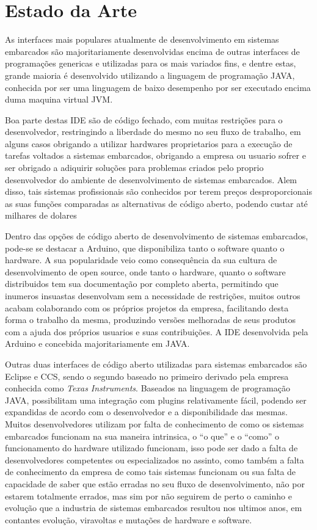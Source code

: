 \chapter{Estado da Arte}
As interfaces mais populares atualmente de desenvolvimento em sistemas embarcados são  majoritariamente desenvolvidas encima de
outras interfaces de programações genericas e utilizadas para os mais variados fins, e dentre estas, grande maioria é desenvolvido
utilizando a linguagem de programação JAVA, conhecida por ser uma linguagem de baixo desempenho por ser executado encima duma maquina
virtual JVM.

Boa parte destas IDE são de código fechado, com muitas restrições para o desenvolvedor, restringindo a liberdade do mesmo no seu fluxo
de trabalho, em alguns casos obrigando a utilizar hardwares proprietarios para a execução de tarefas voltados a sistemas embarcados,
obrigando a empresa ou usuario sofrer e ser obrigado a adiquirir soluções para problemas criados pelo proprio desenvolvedor do
ambiente de desenvolvimento de sistemas embarcados.
Alem disso, tais sistemas profissionais são conhecidos por terem preços desproporcionais as suas funções comparadas as alternativas de
código aberto, podendo custar até milhares de dolares %

Dentro das opções de código aberto de desenvolvimento de sistemas embarcados, pode-se se destacar a Arduino, que disponibiliza tanto o
software quanto o hardware. A sua popularidade veio como consequência da sua cultura de desenvolvimento de open source, onde
tanto o hardware, quanto o software distribuidos tem sua documentação por completo aberta, permitindo que inumeros insuastas desenvolvam
sem a necessidade de restrições, muitos outros acabam colaborando com os próprios projetos da empresa, facilitando desta forma
o trabalho da mesma, produzindo versões melhoradas de seus produtos com a ajuda dos próprios usuarios e suas contribuições. A IDE
desenvolvida pela Arduino e concebida majoritariamente em JAVA.

Outras duas interfaces de código aberto utilizadas para sistemas embarcados são Eclipse e CCS, sendo o segundo baseado no primeiro
derivado pela empresa conhecida como \textit{Texas Instruments}. Baseados na linguagem de programação JAVA, possibilitam uma
integração com plugins relativamente fácil, podendo ser expandidas de acordo com o desenvolvedor e a disponibilidade das mesmas.
Muitos desenvolvedores utilizam por falta de conhecimento de como os sistemas embarcados funcionam na sua maneira intrinsica,
o ``o que'' e o ``como'' o funcionamento do hardware utilizado funcionam, isso pode ser dado a falta de desenvolvedores competentes
ou especializados no assinto, como também a falta de conhecimento da empresa de como tais sistemas funcionam ou sua falta
de capacidade de saber que estão erradas no seu fluxo de desenvolvimento, não por estarem totalmente errados, mas sim por não
seguirem  de perto o caminho e evolução que a industria de sistemas embarcados resultou nos ultimos anos, em contantes evolução,
viravoltas e mutações de hardware e software.


